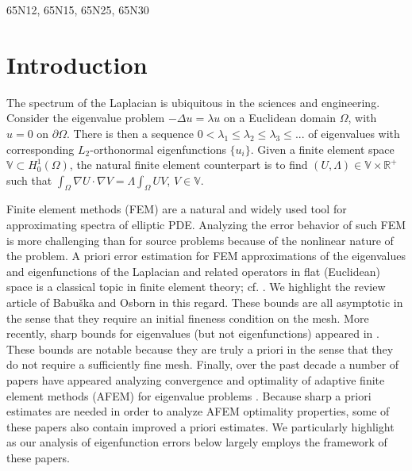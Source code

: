 \documentclass{siamart0516}
\numberwithin{equation}{section}
\numberwithin{theorem}{section}
\numberwithin{figure}{section}
\begin{document}
\begin{AM} 65N12, 65N15, 65N25, 65N30
\end{AM}

\pagestyle{myheadings}
\thispagestyle{plain}



\section{Introduction}

The spectrum of the Laplacian is ubiquitous in the sciences and engineering. Consider the eigenvalue problem $-\Delta u= \lambda u$ on a Euclidean domain $\Omega$, with $u=0$ on $\partial \Omega$.  There is then a  sequence $0 < \lambda_1  \le \lambda_2 \le \lambda _3 \le ...$ of eigenvalues with corresponding $L_2$-orthonormal eigenfunctions $\{ u_i\}$.  Given a finite element space $\mathbb{V} \subset H_0^1(\Omega)$, the natural finite element counterpart is to find $(U, \Lambda) \in \mathbb{V} \times \mathbb{R}^+$ such that $\int_\Omega \nabla U \cdot \nabla V = \Lambda \int_\Omega UV$, $V \in \mathbb{V}$.   

Finite element methods (FEM) are a natural and widely used tool for approximating spectra of elliptic PDE.  
Analyzing the error behavior of such FEM is more challenging than for source problems because of the nonlinear nature of the problem.  A priori error estimation for FEM approximations of the eigenvalues and eigenfunctions of the Laplacian and related operators in flat (Euclidean) space is a classical topic in finite element theory; cf. \cite{PV72, Ch74, BO87, BO89}.  We highlight the review article \cite{BO91} of Babu\v{s}ka and Osborn in this regard.  These bounds are all asymptotic in the sense that they require an initial fineness condition on the mesh.  More recently, sharp bounds for eigenvalues (but not eigenfunctions) appeared in \cite{KnOs06}.  These bounds are notable because they are truly a priori in the sense that they do not require a sufficiently fine mesh.  Finally, over the past decade a number of papers have appeared analyzing convergence and optimality of adaptive finite element methods (AFEM) for eigenvalue problems \cite{DXZ08, GG09, CaGe11, DHZ15, Gallistl, DB16}.  Because sharp a priori estimates are needed in order to analyze AFEM optimality properties, some of these papers also contain improved a priori estimates.  We particularly highlight \cite{CaGe11, Gallistl} as our analysis of eigenfunction errors below largely employs the framework of these papers. 
\end{document}
